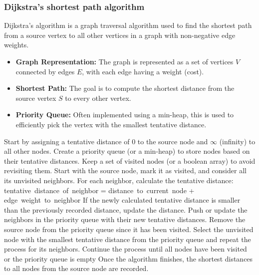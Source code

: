 \documentclass{report}
\begin{document}
\subsubsection{Dijkstra's shortest path algorithm}
\bigbreak \noindent 
Dijkstra's algorithm is a graph traversal algorithm used to find the shortest path from a source vertex to all other vertices in a graph with non-negative edge weights.
\begin{itemize}
    \item \textbf{Graph Representation:} The graph is represented as a set of vertices $V$ connected by edges $E$, with each edge having a weight (cost).
    \item \textbf{Shortest Path:} The goal is to compute the shortest distance from the source vertex $S$ to every other vertex.
    \item \textbf{Priority Queue:} Often implemented using a min-heap, this is used to efficiently pick the vertex with the smallest tentative distance.
\end{itemize}
\bigbreak \noindent 
Start by assigning a tentative distance of 0 to the source node and $\infty$ (infinity) to all other nodes.
\bigbreak \noindent 
Create a priority queue (or a min-heap) to store nodes based on their tentative distances.
\bigbreak \noindent 
Keep a set of visited nodes (or a boolean array) to avoid revisiting them.
\bigbreak \noindent 
Start with the source node, mark it as visited, and consider all its unvisited neighbors.
\bigbreak \noindent 
For each neighbor, calculate the tentative distance: tentative distance of neighbor = distance to current node + edge weight to neighbor
\bigbreak \noindent 
If the newly calculated tentative distance is smaller than the previously recorded distance, update the distance.
\bigbreak \noindent 
Push or update the neighbors in the priority queue with their new tentative distances.
\bigbreak \noindent 
Remove the source node from the priority queue since it has been visited.
\bigbreak \noindent 
Select the unvisited node with the smallest tentative distance from the priority queue and repeat the process for its neighbors.
\bigbreak \noindent
Continue the process until all nodes have been visited or the priority queue is empty
\bigbreak \noindent 
Once the algorithm finishes, the shortest distances to all nodes from the source node are recorded.
\pagebreak \bigbreak \noindent 
\end{document}
